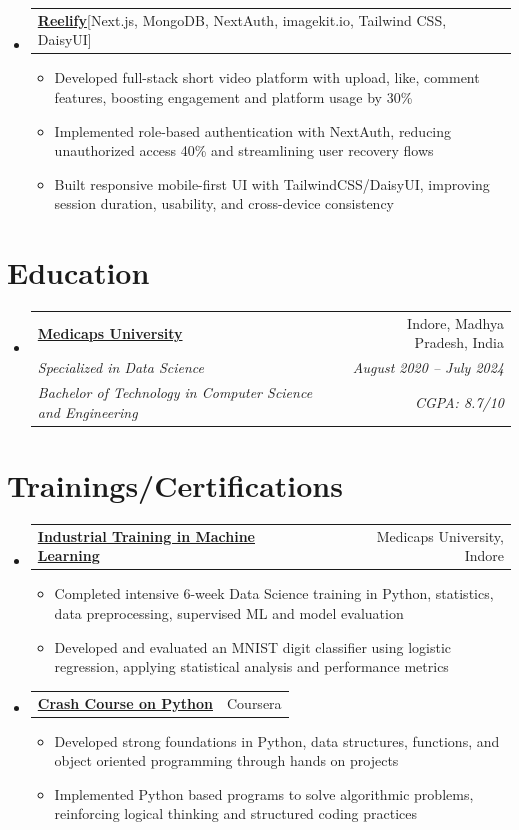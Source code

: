 \documentclass[letterpaper,10pt]{article}
\makeatletter
\newcommand{\resumeItem}[1]{
    \item\small{
      {#1 \vspace{-1pt}}
    }
  }
\newcommand{\resumeCertheading}[2]{
    \item
    \begin{tabular*}{0.97\textwidth}{l@{\extracolsep{\fill}}r}
      \small#1 & #2 \\
    \end{tabular*}\vspace{-5pt}
}
\newcommand{\resumeEduheading}[6]{
  \item
    \begin{tabular*}{0.97\textwidth}[t]{l@{\extracolsep{\fill}}r}
      {#1} & #2 \\
      \textit{\small#3} & \textit{\small #4} \\
      \textit{\small#5} & \textit{\small #6} \\
    \end{tabular*}\vspace{-5pt}
}
\newcommand{\resumeSubheading}[4]{
  \item
    \begin{tabular*}{0.97\textwidth}[t]{l@{\extracolsep{\fill}}r}
      {#1} & #2 \\
      \textit{\small#3} & \textit{\small #4} \\
    \end{tabular*}\vspace{-5pt}
}
\newcommand{\resumeProjectHeading}[2]{
    \item
    \begin{tabular*}{0.97\textwidth}{l@{\extracolsep{\fill}}r}
      \small#1 & #2 \\
    \end{tabular*}\vspace{-5pt}
}
\newcommand{\resumeSubHeadingListStart}{\begin{itemize}[leftmargin=0.15in, label={}]}
\newcommand{\resumeSubHeadingListEnd}{\end{itemize}}
\newcommand{\resumeItemListStart}{\begin{itemize}}
\newcommand{\resumeItemListEnd}{\end{itemize}}
\makeatother
\begin{document}
\resumeSubHeadingListStart
\resumeProjectHeading
{\textbf{\href{https://github.com/shanutiwari1010/reelify}
{Reelify}\hspace{5pt}}{[Next.js, MongoDB, NextAuth, imagekit.io, Tailwind CSS, DaisyUI]}}{}

\resumeItemListStart
  \resumeItem{Developed full-stack short video platform with upload, like, comment features, boosting engagement and platform usage by 30\%}
  \resumeItem{Implemented role-based authentication with NextAuth, reducing unauthorized access 40\% and streamlining user recovery flows}
  \resumeItem{Built responsive mobile-first UI with TailwindCSS/DaisyUI, improving session duration, usability, and cross-device consistency}
\resumeItemListEnd
\resumeSubHeadingListEnd


\section{Education}
\resumeSubHeadingListStart

\resumeEduheading
{\textbf{\href{https://medicaps.ac.in}{Medicaps University}}}{Indore, Madhya Pradesh, India}
{Specialized in Data Science}{August 2020 -- July 2024}
  {Bachelor of Technology in Computer Science and Engineering}{CGPA: 8.7/10}
  
\resumeSubHeadingListEnd




\section{Trainings/Certifications}
\resumeSubHeadingListStart

\resumeCertheading
{\textbf{\href{https://medicaps.ac.in/}{Industrial Training in Machine Learning}}}{Medicaps University, Indore}
\resumeItemListStart
\resumeItem{Completed intensive 6-week Data Science training in Python, statistics, data preprocessing, supervised ML and model evaluation}
\resumeItem{Developed and evaluated an MNIST digit classifier using logistic regression, applying statistical analysis and performance metrics}
\resumeItemListEnd

\resumeCertheading
{\textbf{\href{https://coursera.org/verify/FHDUZAK7YL3Q}{Crash Course on Python}\hspace{3pt}}{{}}}{Coursera}
\resumeItemListStart
\resumeItem{Developed strong foundations in Python, data structures, functions, and object oriented programming through hands on projects}

\resumeItem{Implemented Python based programs to solve algorithmic problems, reinforcing logical thinking and structured coding practices}
\resumeItemListEnd
\resumeSubHeadingListEnd
\end{document}
